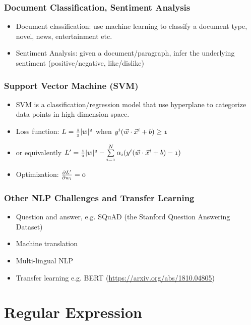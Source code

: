 \documentclass[notheorems, aspectratio=54]{beamer}
\begin{document}
\begin{frame}
\frametitle{Document Classification, Sentiment Analysis}
\begin{itemize}
\item Document classification: use machine learning to classify a document type, novel, news, entertainment etc. 
\item Sentiment Analysis: given a document/paragraph, infer the underlying sentiment (positive/negative, like/dislike)
\end{itemize}
\end{frame}


\begin{frame}
\frametitle{Support Vector Machine (SVM)}

\begin{itemize}
\item SVM is a classification/regression model that use hyperplane to categorize data points in high dimension space. 
\item Loss function: $\mathnormal{L=\frac{1}{2}|w|^2}$ when $\mathnormal{y^i (\vec{w}\cdot \vec{x}^i+b)\geq 1}$
\item or equivalently  $\mathnormal{L'=\frac{1}{2}|w|^2-\sum\limits_{i=1}^N \alpha_i (y^i (\vec{w}\cdot \vec{x}^i+b)-1)}$ 
\item Optimization: $\mathnormal{\frac{\partial L'}{\partial w_i}=0}$
\end{itemize}

\end{frame}


\begin{frame}
\frametitle{Other NLP Challenges and Transfer Learning}

\begin{itemize}
\item Question and answer, e.g. SQuAD (the Stanford Question Answering Dataset)
\item Machine translation
\item Multi-lingual NLP
\item Transfer learning e.g. BERT (\url {https://arxiv.org/abs/1810.04805})
\end{itemize}

\end{frame}

\section{Regular Expression}
\end{document}
